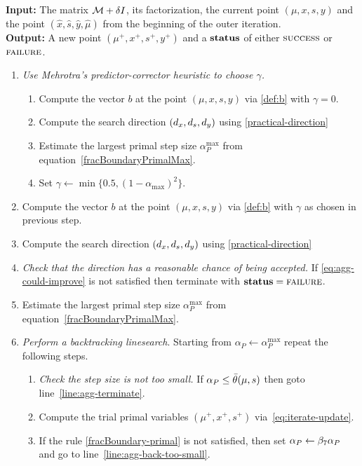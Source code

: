 \documentclass{article}
\begin{document}
\begin{algorithm}[H]
\textbf{Input:} The matrix $\mathcal{M} + \delta I$, its factorization, the current point $(\mu, x, s, y)$ and the point $(\hat{x}, \hat{s},  \hat{y}, \hat{\mu})$ from the beginning of the outer iteration.  \\
\textbf{Output:} A new point $(\mu^{+}, x^{+}, s^{+}, y^{+})$ and a $\textbf{status}$ of either $\textsc{success}$ or $\textsc{failure}$.
\begin{enumerate}[label*=A.{\arabic*}]
\item \emph{Use Mehrotra's predictor-corrector heuristic to choose $\gamma$.} 
\begin{enumerate}[label*=.{\arabic*}]
\item Compute the vector $b$ at the point $(\mu, x, s, y)$ via \eqref{def:b} with $\gamma = 0$.
\item Compute the search direction $(d_{x}, d_{s}, d_{y})$ using \eqref{practical-direction}
\item Estimate the largest primal step size $\alpha^{\max}_{P}$ from equation~\eqref{fracBoundaryPrimalMax}.
\item Set $\gamma \gets \min\{0.5, (1 - \alpha_{\max})^2 \}$.
\end{enumerate}
\item Compute the vector $b$ at the point $(\mu, x, s, y)$ via \eqref{def:b} with $\gamma$ as chosen in previous step.
\item Compute the search direction $(d_{x}, d_{s}, d_{y})$ using \eqref{practical-direction}
\item \emph{Check that the direction has a reasonable chance of being accepted.} If \eqref{eq:agg-could-improve} is not satisfied then terminate with $\textbf{status} = \textsc{failure}$.
\item Estimate the largest primal step size $\alpha^{\max}_{P}$ from equation~\eqref{fracBoundaryPrimalMax}.
\item \label{agg:line:back-track} \emph{Perform a backtracking linesearch}. Starting from $\alpha_{P} \gets \alpha^{\max}_{P}$ repeat the following steps.
\begin{enumerate}[label*=.{\arabic*}]
\item \label{line:agg-back-too-small} \emph{Check the step size is not too small.} If $\alpha_{P} \le \bar{\theta}(\mu, s)$ then goto line~\ref{line:agg-terminate}.
\item Compute the trial primal variables $(\mu^{+}, x^{+}, s^{+})$ via~\eqref{eq:iterate-update}.
\item If the \fracBound{} rule \eqref{fracBoundary-primal} is not satisfied, then set $\alpha_{P} \gets \beta_{7} \alpha_{P}$ and go to line~\ref{line:agg-back-too-small}.

\end{enumerate}
\end{enumerate}
\end{algorithm}
\end{document}
